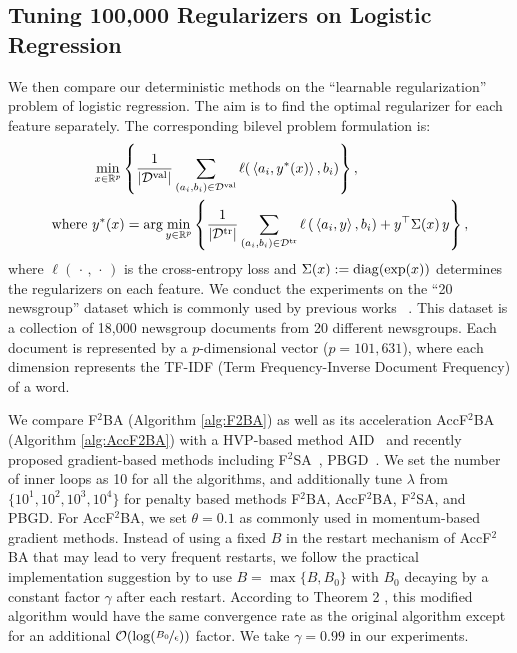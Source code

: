 \documentclass[twoside,11pt]{article}
\begin{document}
{\subsection{Tuning 100,000 Regularizers on Logistic Regression}

We then compare our deterministic methods on the ``learnable regularization'' problem of  logistic regression. The aim is to find the optimal regularizer for each feature separately. The corresponding bilevel problem formulation is:
\begin{align} \label{eq:l2reg}
\begin{split}
    &\min_{x \in {\mathbb{R}}^p}  \left\{ \frac{1}{\vert {\mathcal{D}}^{\rm val} \vert} \sum_{(a_i,b_i) \in {\mathcal{D}}^{\rm val}} \ell(\, \langle a_i,y^*(x) \rangle\,,b_i) \right\}, \\
    \text{where } & y^*(x) = \arg \min_{y \in {\mathbb{R}}^p}  \left\{ \frac{1}{\vert {\mathcal{D}}^{\rm tr} \vert} \sum_{(a_i,b_i) \in {\mathcal{D}}^{\rm tr}} 
\ell \left( \,\langle a_i,y \rangle\,,b_i \right) + y^\top \Sigma(x) \,y \right\},
\end{split}
\end{align}
where $\ell(\,\cdot\,, \,\cdot\,)$ is the cross-entropy loss and $\Sigma(x) := {\rm diag}(\exp(x))$ determines the regularizers on each feature. We conduct the experiments on the ``20 newsgroup'' dataset which is commonly used by previous works ~\citep{grazzi2020iteration,ji2021bilevel}. This dataset 
is a collection of 18,000 newsgroup documents from 20 different newsgroups. Each document is represented by a $p$-dimensional vector ($p= 101,631$), where each dimension represents the TF-IDF (Term Frequency-Inverse Document Frequency) of a word. 

We compare F${}^2$BA (Algorithm \ref{alg:F2BA}) as well as its acceleration AccF${}^2$BA (Algorithm \ref{alg:AccF2BA}) with a HVP-based method AID~\citep{grazzi2020iteration,ji2021bilevel} and recently proposed gradient-based methods including F${}^2$SA~\citep{kwon2023fully}, PBGD~\citep{shen2023penalty}. 
We set the number of inner loops as 10 for all the algorithms, and additionally tune $\lambda$ from $\{10^1, 10^2, 10^3, 10^4\}$ for penalty based methods F${}^2$BA, AccF${}^2$BA, F${}^2$SA, and PBGD. 
For AccF${}^2$BA, we set $\theta = 0.1$ as commonly used in momentum-based gradient methods. Instead of using a fixed $B$ in the restart mechanism of AccF${}^2$BA that may lead to very frequent restarts, we follow the practical implementation suggestion by \citet{li2023restarted} to use $B= \max\{B,B_0\}$ with $B_0$ decaying by a constant factor $\gamma$ after each restart. According to Theorem 2 \citep{li2023restarted}, this modified algorithm would have the same convergence rate as the original algorithm except for an additional ${\mathcal{O}}(\log (\nicefrac{B_0}{\epsilon}))$ factor. We take $\gamma = 0.99$ in our experiments.

}
\end{document}
